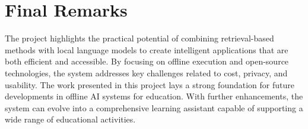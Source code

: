 \documentclass[12pt,a4paper]{report}
\begin{document}
\section{Final Remarks}
The project highlights the practical potential of combining retrieval-based methods with local language models to create intelligent applications that are both efficient and accessible. By focusing on offline execution and open-source technologies, the system addresses key challenges related to cost, privacy, and usability.
The work presented in this project lays a strong foundation for future developments in offline AI systems for education. With further enhancements, the system can evolve into a comprehensive learning assistant capable of supporting a wide range of educational activities.
\end{document}
